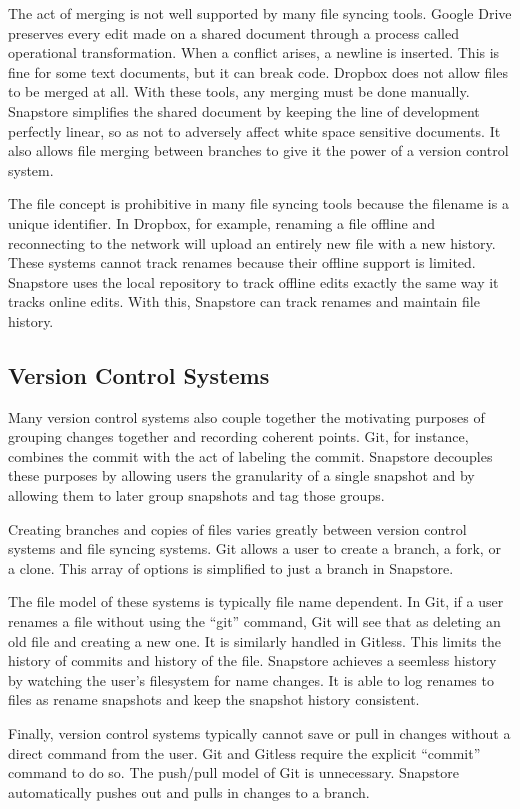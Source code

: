 The act of merging is not well supported by many file syncing tools. Google Drive preserves every edit made on a shared document through a process called operational transformation. When a conflict arises, a newline is inserted. This is fine for some text documents, but it can break code. Dropbox does not allow files to be merged at all. With these tools, any merging must be done manually. Snapstore simplifies the shared document by keeping the line of development perfectly linear, so as not to adversely affect white space sensitive documents. It also allows file merging between branches to give it the power of a version control system.

The file concept is prohibitive in many file syncing tools because the filename is a unique identifier. In Dropbox, for example, renaming a file offline and reconnecting to the network will upload an entirely new file with a new history. These systems cannot track renames because their offline support is limited. Snapstore uses the local repository to track offline edits exactly the same way it tracks online edits. With this, Snapstore can track renames and maintain file history.

\subsection{Version Control Systems}

Many version control systems also couple together the motivating purposes of grouping changes together and recording coherent points. Git, for instance, combines the commit with the act of labeling the commit. Snapstore decouples these purposes by allowing users the granularity of a single snapshot and by allowing them to later group snapshots and tag those groups.

Creating branches and copies of files varies greatly between version control systems and file syncing systems. Git allows a user to create a branch, a fork, or a clone. This array of options is simplified to just a branch in Snapstore. 

The file model of these systems is typically file name dependent. In Git, if a user renames a file without using the ``git'' command, Git will see that as deleting an old file and creating a new one. It is similarly handled in Gitless. This limits the history of commits and history of the file. Snapstore achieves a seemless history by watching the user's filesystem for name changes. It is able to log renames to files as rename snapshots and keep the snapshot history consistent.

Finally, version control systems typically cannot save or pull in changes without a direct command from the user. Git and Gitless require the explicit ``commit'' command to do so. The push/pull model of Git is unnecessary. Snapstore automatically pushes out and pulls in changes to a branch.




